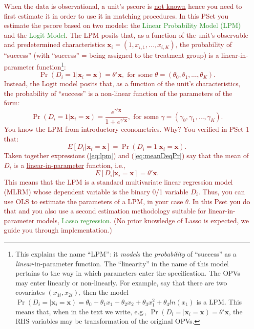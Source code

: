 \documentclass{article}
\begin{document}
\noindent \textcolor{Maroon}{When the data is observational, a unit's pscore is \underline{not known} hence you need to first estimate it in order to use it in matching procedures. In this PSet you estimate the pscore based on two models: the \textcolor{ForestGreen}{Linear Probability Model (LPM)} and the \textcolor{ForestGreen}{Logit Model}. The LPM posits that, as a function of the unit's observable and predetermined characteristics $\mathbf{x}_i=(1, x_{i,1},\ldots,x_{i,K})$, the probability of ``success'' (with ``success'' = being assigned to the treatment group) is a linear-in-parameter function\footnote{This explains the name ``LPM'': it \textit{models} the \textit{probability} of “success” as a \textit{linear}-in-parameter function. The ``linearity'' in the name of this model pertains to the way in which parameters enter the specification. The OPVs may enter linearly or non-linearly. For example, say that there are two covariates $(x_{1i},x_{2i})$, then the model $\Pr(D_i=|\mathbf{x}_i=\mathbf{x})=\theta_0+\theta_1 x_{1}+\theta_2 x_{2}+\theta_3 x_{1}^2+\theta_4 ln(x_{1})$ is a LPM. This means that, when in the text we write, e.g., $\Pr(D_i=|\mathbf{x}_i=\mathbf{x})=\theta'\mathbf{x}$, the RHS variables may be transformation of the original OPVs.}:
\begin{equation}\label{eq:lpm}
\Pr(D_i=1|\mathbf{x}_i=\mathbf{x})=\theta'\mathbf{x}, \text{ for some } \theta=(\theta_0,\theta_1, \ldots, \theta_K).
\end{equation}
\noindent Instead, the Logit model posits that, as a function of the unit's characteristics, the probability of ``success'' is a non-linear function of the parameters of the form:
\begin{equation}\label{eq:logit}
\Pr(D_i=1|\mathbf{x}_i=\mathbf{x})=\frac{e^{\gamma'\mathbf{x}}}{1 + e^{\gamma'\mathbf{x}}}, \text{ for some } \gamma=(\gamma_0,\gamma_1, \ldots, \gamma_K).
\end{equation}
\noindent You know the LPM from introductory econometrics. Why? You verified in PSet 1 that: 
\begin{equation}\label{eq:meanDeqPr}
E[D_i|\mathbf{x}_i=\mathbf{x}]=\Pr(D_i=1|\mathbf{x}_i=\mathbf{x}).
\end{equation}
Taken together expressions (\ref{eq:lpm}) and (\ref{eq:meanDeqPr}) say that the mean of $D_i$ is a \underline{linear-in-parameter} function, i.e., 
\begin{equation}\label{eq:meanLPM}
E[D_i|\mathbf{x}_i=\mathbf{x}]=\theta'\mathbf{x}. 
\end{equation}
This means that the LPM is a standard multivariate linear regression model (MLRM) whose dependent variable is the binary 0/1 variable $D_i$. Thus, you can use OLS to estimate the parameters of a LPM, in your case $\theta$. In this Pset you do that and you also use a second estimation methodology suitable for linear-in-parameter models, \textcolor{ForestGreen}{Lasso regression}. (No prior knowledge of Lasso is expected, we guide you through implementation.)}\\
\end{document}
